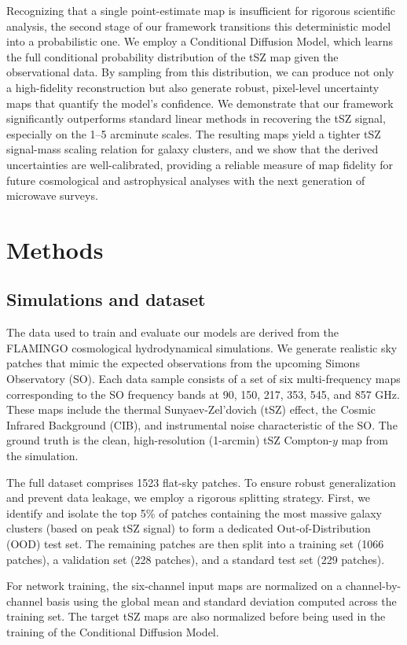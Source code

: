 \documentclass[]{article}
\begin{document}
Recognizing that a single point-estimate map is insufficient for rigorous scientific analysis, the second stage of our framework transitions this deterministic model into a probabilistic one. We employ a Conditional Diffusion Model, which learns the full conditional probability distribution of the tSZ map given the observational data. By sampling from this distribution, we can produce not only a high-fidelity reconstruction but also generate robust, pixel-level uncertainty maps that quantify the model's confidence. We demonstrate that our framework significantly outperforms standard linear methods in recovering the tSZ signal, especially on the 1--5 arcminute scales. The resulting maps yield a tighter tSZ signal-mass scaling relation for galaxy clusters, and we show that the derived uncertainties are well-calibrated, providing a reliable measure of map fidelity for future cosmological and astrophysical analyses with the next generation of microwave surveys.

\section{Methods}
\label{sec:methods}
\subsection{Simulations and dataset}
The data used to train and evaluate our models are derived from the FLAMINGO cosmological hydrodynamical simulations. We generate realistic sky patches that mimic the expected observations from the upcoming Simons Observatory (SO). Each data sample consists of a set of six multi-frequency maps corresponding to the SO frequency bands at 90, 150, 217, 353, 545, and 857 GHz. These maps include the thermal Sunyaev-Zel'dovich (tSZ) effect, the Cosmic Infrared Background (CIB), and instrumental noise characteristic of the SO. The ground truth is the clean, high-resolution (1-arcmin) tSZ Compton-$y$ map from the simulation.

The full dataset comprises 1523 flat-sky patches. To ensure robust generalization and prevent data leakage, we employ a rigorous splitting strategy. First, we identify and isolate the top 5\% of patches containing the most massive galaxy clusters (based on peak tSZ signal) to form a dedicated Out-of-Distribution (OOD) test set. The remaining patches are then split into a training set (1066 patches), a validation set (228 patches), and a standard test set (229 patches).

For network training, the six-channel input maps are normalized on a channel-by-channel basis using the global mean and standard deviation computed across the training set. The target tSZ maps are also normalized before being used in the training of the Conditional Diffusion Model.
\end{document}
